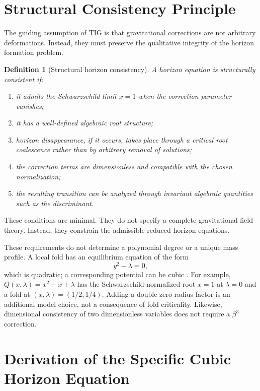 \documentclass[11pt,a4paper]{article}
\newtheorem{definition}{Definition}
\begin{document}
\section{Structural Consistency Principle}

The guiding assumption of TIG is that gravitational corrections are not
arbitrary deformations. Instead, they must preserve the qualitative integrity of
the horizon formation problem.

\begin{definition}[Structural horizon consistency]
A horizon equation is structurally consistent if:
\begin{enumerate}[label=(\roman*)]
\item it admits the Schwarzschild limit \(x=1\) when the correction parameter
vanishes;
\item it has a well-defined algebraic root structure;
\item horizon disappearance, if it occurs, takes place through a critical root
coalescence rather than by arbitrary removal of solutions;
\item the correction terms are dimensionless and compatible with the chosen
normalization;
\item the resulting transition can be analyzed through invariant algebraic
quantities such as the discriminant.
\end{enumerate}
\end{definition}

These conditions are minimal. They do not specify a complete gravitational field
theory. Instead, they constrain the admissible reduced horizon equations.

These requirements do not determine a polynomial degree or a unique mass
profile. A local fold has an equilibrium equation of the form
\begin{equation}
y^2-\lambda=0,
\end{equation}
which is quadratic; a corresponding potential can be cubic
\cite{arnold1992,chasnov2020}. For example,
\(Q(x,\lambda)=x^2-x+\lambda\) has the Schwarzschild-normalized root \(x=1\)
at \(\lambda=0\) and a fold at \((x,\lambda)=(1/2,1/4)\).
Adding a double zero-radius factor is an additional model choice, not a
consequence of fold criticality. Likewise, dimensional consistency of two
dimensionless variables does not require a \(\beta^3\) correction.

\section{Derivation of the Specific Cubic Horizon Equation}
\end{document}
